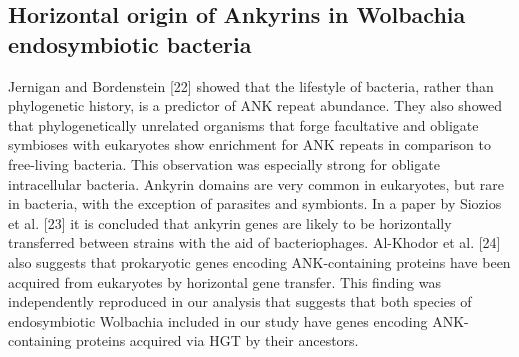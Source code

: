 \subsection{Horizontal origin of Ankyrins in Wolbachia endosymbiotic bacteria}
Jernigan and Bordenstein [22] showed that the lifestyle of bacteria, rather than phylogenetic history, is a predictor of ANK repeat abundance. They also showed that phylogenetically unrelated organisms that forge facultative and obligate symbioses with eukaryotes show enrichment for ANK repeats in comparison to free-living bacteria. This observation was especially strong for obligate intracellular bacteria. Ankyrin domains are very common in eukaryotes, but rare in bacteria, with the exception of parasites and symbionts. In a paper by Siozios et al. [23] it is concluded that ankyrin genes are likely to be horizontally transferred between strains with the aid of bacteriophages. Al-Khodor et al. [24] also suggests that prokaryotic genes encoding ANK-containing proteins have been acquired from eukaryotes by horizontal gene transfer. This finding was independently reproduced in our analysis that suggests that both species of endosymbiotic Wolbachia included in our study have genes encoding ANK-containing proteins acquired via HGT by their ancestors.
